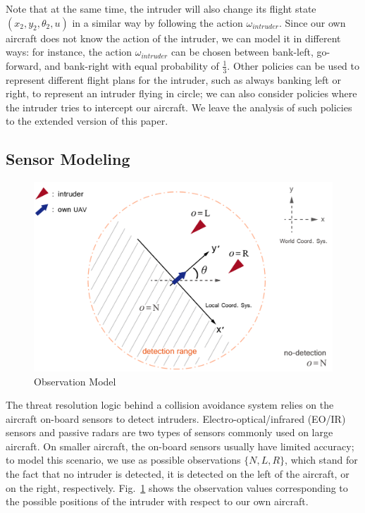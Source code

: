 \documentclass{article}
\begin{document}
Note that at the same time, the intruder will also change its flight state $(x_{2}, y_{2}, \theta_{2}, u)$ in a similar way by following the action $\omega_{\mathit{intruder}}$.
Since our own aircraft does not know the action of the intruder, we can model it in different ways:
for instance, the action $\omega_{\mathit{intruder}}$ can be chosen between bank-left, go-forward, and bank-right with equal probability of $\frac{1}{3}$.
Other policies can be used to represent different flight plans for the intruder, such as always banking left or right, to represent an intruder flying in circle;
we can also consider policies where the intruder tries to intercept our aircraft.
We leave the analysis of such policies to the extended version of this paper.



\subsection{Sensor Modeling}
\label{ssec:sensorModeling}

\begin{figure}[t]
	\centering
	\includegraphics[width=0.7\linewidth]{observationModel}
	\caption{Observation Model}
	\label{fig:observationModel}
\end{figure}
The threat resolution logic behind a collision avoidance system relies on the aircraft on-board sensors to detect intruders.
Electro-optical/infrared (EO/IR) sensors and passive radars are two types of sensors commonly used on large aircraft.
On smaller aircraft, the on-board sensors usually have limited accuracy;
to model this scenario, we use as possible observations $\{N, L, R\}$, which stand for the fact that no intruder is detected, it is detected on the left of the aircraft, or on the right, respectively. 
Fig.~\ref{fig:observationModel} shows the observation values corresponding to the possible positions of the intruder with respect to our own aircraft.
\end{document}
